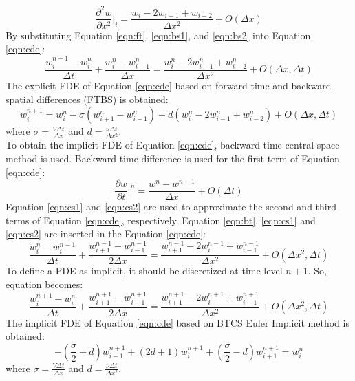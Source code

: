 \documentclass[letterpaper,12pt]{article}
\begin{document}
\begin{equation}
	\frac{\partial^2 w}{\partial x^2}\vert_{i}=\frac{w_{i}-2w_{i-1}+w_{i-2}}{\Delta x^2}+O(\Delta x)
	\label{eqn:bs2}
\end{equation}
By substituting Equation \ref{eqn:ft}, \ref{eqn:bs1}, and \ref{eqn:bs2} into Equation \ref{eqn:cde}:
\begin{equation}
	\frac{w_{i}^{n+1}-{w_{i}^{n}}}{\Delta t}+\frac{w_{i}^{n}-w_{i-1}^{n}}{\Delta x}
	=\frac{w_{i}^{n}-2w_{i-1}^{n}+w_{i-2}^{n}}{\Delta x^2}+O(\Delta x,\Delta t)
\end{equation}
The explicit FDE of Equation \ref{eqn:cde} based on forward time and backward spatial
differences (FTBS) is obtained:
\begin{equation}
	w_{i}^{n+1}= w_{i}^{n}-\sigma(w_{i+1}^{n}-w_{i-1}^{n})+d(w_{i}^{n}-2w_{i-1}^{n}+w_{i-2}^{n})+O(\Delta x,\Delta t)
\end{equation}
where $\sigma = \frac{V\Delta t}{\Delta x }$ and $d = \frac{\nu\Delta t}{\Delta x^2 }$.
\\ To obtain the implicit FDE of Equation \ref{eqn:cde}, backward time central space method is used.
Backward time difference is used for the first term of Equation \ref{eqn:cde}:
\begin{equation}
	\frac{\partial w}{\partial t}\vert^{n}=\frac{w^{n}-w^{n-1}}{\Delta x}+O(\Delta t)
	\label{eqn:bt}
\end{equation}
Equation \ref{eqn:cs1} and \ref{eqn:cs2} are used to approximate the second and third
terms of Equation \ref{eqn:cde}, respectively. Equation \ref{eqn:bt}, \ref{eqn:cs1}
and \ref{eqn:cs2} are inserted in the Equation \ref{eqn:cde}:
\begin{equation}
	\frac{w_{i}^{n}-{w_{i}^{n-1}}}{\Delta t}+\frac{w_{i+1}^{n-1}-w_{i-1}^{n-1}}{2\Delta x}
	=\frac{w_{i+1}^{n-1}-2w_{i}^{n-1}+w_{i-1}^{n-1}}{\Delta x^2}+O(\Delta x^2, \Delta t)
\end{equation}
To define a PDE as implicit, it should be discretized at time level $n+1$. So, equation becomes:
\begin{equation}
	\frac{w_{i}^{n+1}-{w_{i}^{n}}}{\Delta t}+\frac{w_{i+1}^{n+1}-w_{i-1}^{n+1}}{2\Delta x}
	=\frac{w_{i+1}^{n+1}-2w_{i}^{n+1}+w_{i-1}^{n+1}}{\Delta x^2}+O(\Delta x^2, \Delta t)	
\end{equation}
The implicit FDE of Equation \ref{eqn:cde} based on BTCS Euler Implicit method is obtained:
\begin{equation}
	-(\frac{\sigma}{2}+d)w_{i-1}^{n+1}+(2d+1)w_{i}^{n+1}+(\frac{\sigma}{2}-d)w_{i+1}^{n+1} = w_{i}^{n}
	\label{eqn:implicit}
\end{equation}
where $\sigma = \frac{V\Delta t}{\Delta x }$ and $d = \frac{\nu\Delta t}{\Delta x^2 }$.
\newpage
\end{document}
